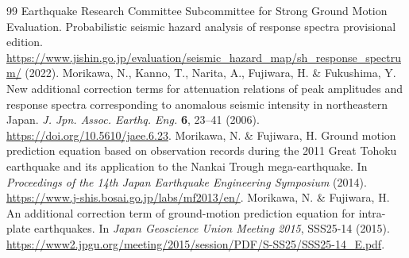 \begin{thebibliography}{99}
 Earthquake Research Committee Subcommittee for Strong Ground Motion Evaluation. Probabilistic seismic hazard analysis of response spectra provisional edition. \url{https://www.jishin.go.jp/evaluation/seismic_hazard_map/sh_response_spectrum/} (2022).
 Morikawa, N., Kanno, T., Narita, A., Fujiwara, H. \& Fukushima, Y. New additional correction terms for attenuation relations of peak amplitudes and response spectra corresponding to anomalous seismic intensity in northeastern Japan. \textit{J. Jpn. Assoc. Earthq. Eng.} \textbf{6}, 23--41 (2006). \url{https://doi.org/10.5610/jaee.6.23}.
 Morikawa, N. \& Fujiwara, H. Ground motion prediction equation based on observation records during the 2011 Great Tohoku earthquake and its application to the Nankai Trough mega-earthquake. In \textit{Proceedings of the 14th Japan Earthquake Engineering Symposium} (2014). \url{https://www.j-shis.bosai.go.jp/labs/mf2013/en/}.
 Morikawa, N. \& Fujiwara, H. An additional correction term of ground-motion prediction equation for intra-plate earthquakes. In \textit{Japan Geoscience Union Meeting 2015}, SSS25-14 (2015). \url{https://www2.jpgu.org/meeting/2015/session/PDF/S-SS25/SSS25-14_E.pdf}.
\end{thebibliography}
